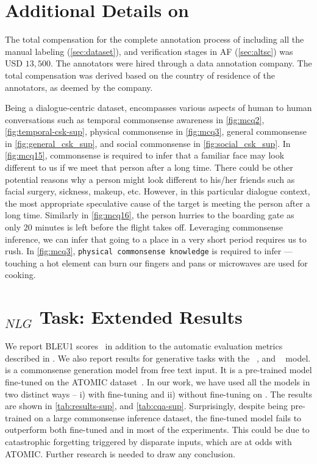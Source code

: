 \section{Additional Details on \dataset{}}
The total compensation for the complete annotation process of \dataset{} including all the manual labeling (\cref{sec:dataset}), and verification stages in AF (\cref{sec:altsc}) was USD $13,500$. The annotators were hired through a data annotation company. The total compensation was derived based on the country of residence of the annotators, as deemed by the company.

Being a dialogue-centric dataset, \dataset{} encompasses various aspects of human to human conversations such as temporal commonsense awareness in \cref{fig:mcq2}, \cref{fig:temporal-csk-sup}, physical commonsense in \cref{fig:mcq3}, general commonsense in \cref{fig:general_csk_sup}, and social commonsense in \cref{fig:social_csk_sup}.  In \cref{fig:mcq15}, commonsense is required to infer that a familiar face may look different to us if we meet that person after a long time. There could be other potential reasons why a person might look different to his/her friends such as facial surgery, sickness, makeup, etc. However, in this particular dialogue context, the most appropriate speculative cause of the target is meeting the person after a long time. Similarly in \cref{fig:mcq16}, the person hurries to the boarding gate as only 20 minutes is left before the flight takes off. Leveraging commonsense inference, we can infer that going to a place in a very short period requires us to rush.  In \cref{fig:mcq3}, \texttt{physical commonsense knowledge} is required to infer --- touching a hot element can burn our fingers and pans or microwaves are used for cooking.

\section{\dataset{}$_{NLG}$ Task: Extended Results}
\label{sec:appendix-ex}
We report BLEU1 scores~\cite{papineni2002bleu} in addition to the automatic evaluation metrics described in . We also report results for generative tasks with the  ~\cite{lewis2019bart}, and ~\cite{Hwang2021COMETATOMIC2O} model.  is a commonsense generation model from free text input. It is a pre-trained  model fine-tuned on the ATOMIC dataset~\cite{Hwang2021COMETATOMIC2O}. In our work, we have used all the models in two distinct ways -- i) with fine-tuning and ii) without fine-tuning on \dataset{}. The results are shown in \cref{tab:results-sup}, and \cref{tab:cqa-sup}. Surprisingly, despite being pre-trained on a large commonsense inference dataset, the fine-tuned  model fails to outperform both fine-tuned  and  in most of the experiments. This could be due to catastrophic forgetting triggered by disparate inputs, which are at odds with ATOMIC. Further research is needed to draw any conclusion.

